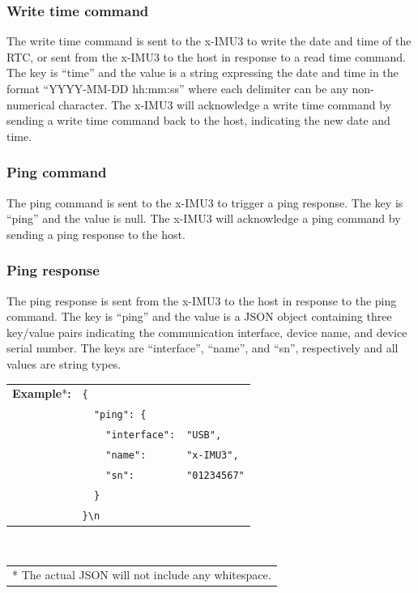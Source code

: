 
\subsubsection{Write time command}

The write time command is sent to the x-IMU3 to write the date and time of the \ac{RTC}, or sent from the x-IMU3 to the host in response to a read time command.  The key is \enquote{time} and the value is a string expressing the date and time in the format \enquote{YYYY-MM-DD hh:mm:ss} where each delimiter can be any non-numerical character.  The x-IMU3 will acknowledge a write time command by sending a write time command back to the host, indicating the new date and time.


\subsubsection{Ping command}

The ping command is sent to the x-IMU3 to trigger a ping response.  The key is \enquote{ping} and the value is null.  The x-IMU3 will acknowledge a ping command by sending a ping response to the host.


\subsubsection{Ping response}

The ping response is sent from the x-IMU3 to the host in response to the ping command.  The key is \enquote{ping} and the value is a \ac{JSON} object containing three key/value pairs indicating the communication interface, device name, and device serial number.  The keys are \enquote{interface}, \enquote{name}, and \enquote{sn}, respectively and all values are string types.

\begin{table}[H]
    \begin{tabular}{l l l}
        \textbf{Example}*\textbf{:} & \texttt{\{}\\
        & \texttt{~~"ping":~\{} &\\
        & \texttt{~~~~"interface":} & \texttt{"USB",}\\
        & \texttt{~~~~"name":} & \texttt{"x-IMU3",}\\
        & \texttt{~~~~"sn":} & \texttt{"01234567"}\\
        & \texttt{~~\}}\\
        & \texttt{\}\textbackslash n}\\
    \end{tabular}\\
    \begin{tabular}{l}
        \\
        \footnotesize{* The actual \acs{JSON} will not include any whitespace.}
    \end{tabular}
\end{table}

